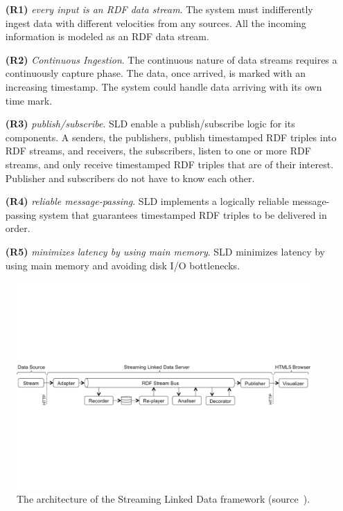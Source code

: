 \begin{itemize}
\item[\textbf{(R1)}] \emph{every input is an RDF data stream}. The system must indifferently ingest data with different velocities from any sources. All the incoming information is modeled as an RDF data stream. 
\item[\textbf{(R2)}] \emph{Continuous Ingestion}. The continuous nature of data streams requires a continuously capture phase. The data, once arrived, is marked with an increasing timestamp. The system could handle data arriving with its own time mark.
\item[\textbf{(R3)}] \emph{publish/subscribe}. SLD enable a publish/subscribe logic for its components. A senders, the \textsf{publishers}, publish timestamped RDF triples into RDF streams,  and receivers, the \textsf{subscribers}, listen to one or more RDF streams, and only receive timestamped RDF triples that are of their interest. Publisher and subscribers do not have to know each other.
\item[\textbf{(R4)}] \emph{reliable message-passing}. SLD implements a logically reliable message-passing system that guarantees timestamped RDF triples to be delivered in order.
\item[\textbf{(R5)}] \emph{minimizes latency by using main memory}. SLD minimizes latency by using main memory and avoiding disk I/O bottlenecks.
\end{itemize}

\begin{figure}[t]
\begin{center}
\includegraphics[width=.9\textwidth]{img/SLD-arch}
\caption{The architecture of the Streaming Linked Data framework (source~\cite{DBLP:conf/semweb/BalduiniVDTPC13}).}
\label{fig:sld-arch}
\end{center}
\end{figure}

